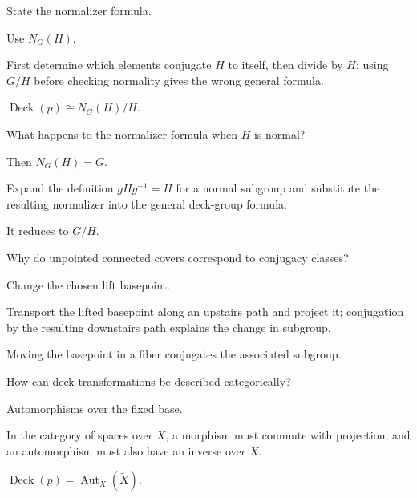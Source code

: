 \begin{exercise}\label{exr:viii12-20}
State the normalizer formula.
\end{exercise}
\begin{hint}
Use \(N_G(H)\).

First determine which elements conjugate \(H\) to itself, then divide by \(H\); using \(G/H\) before checking normality gives the wrong general formula.
\end{hint}
\begin{solution}
\(\operatorname{Deck}(p)\cong N_G(H)/H\).
\end{solution}

\begin{exercise}\label{exr:viii12-21}
What happens to the normalizer formula when \(H\) is normal?
\end{exercise}
\begin{hint}
Then \(N_G(H)=G\).

Expand the definition \(gHg^{-1}=H\) for a normal subgroup and substitute the resulting normalizer into the general deck-group formula.
\end{hint}
\begin{solution}
It reduces to \(G/H\).
\end{solution}

\begin{exercise}\label{exr:viii12-22}
Why do unpointed connected covers correspond to conjugacy classes?
\end{exercise}
\begin{hint}
Change the chosen lift basepoint.

Transport the lifted basepoint along an upstairs path and project it; conjugation by the resulting downstairs path explains the change in subgroup.
\end{hint}
\begin{solution}
Moving the basepoint in a fiber conjugates the associated subgroup.
\end{solution}

\begin{exercise}\label{exr:viii12-23}
How can deck transformations be described categorically?
\end{exercise}
\begin{hint}
Automorphisms over the fixed base.

In the category of spaces over \(X\), a morphism must commute with projection, and an automorphism must also have an inverse over \(X\).
\end{hint}
\begin{solution}
\(\operatorname{Deck}(p)=\operatorname{Aut}_X(\widetilde X)\).
\end{solution}

